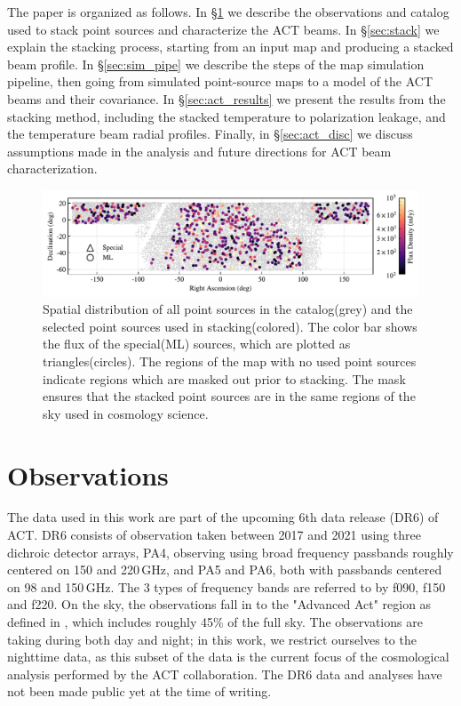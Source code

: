 The paper is organized as follows. 
In \S\ref{sec:observations} we describe the observations and catalog used to stack point sources and characterize the ACT beams.  In \S\ref{sec:stack} we explain the stacking process, starting from an input map and producing a stacked beam profile.  In \S\ref{sec:sim_pipe} we describe the steps of the map simulation pipeline, then going from simulated point-source maps to a model of the ACT beams and their covariance.  In \S\ref{sec:act_results} we present the results from the stacking method, including the stacked temperature to polarization leakage, and the temperature beam radial profiles.  Finally, in \S\ref{sec:act_disc} we discuss assumptions made in the analysis and future directions for ACT beam characterization.

\begin{figure}[t]
    \centering
    \includegraphics[width = \textwidth]{Figures/flux_map.pdf}
    \caption{Spatial distribution of all point sources in the catalog(grey) and the selected point sources used in stacking(colored).  The color bar shows the flux of the special(ML) sources, which are plotted as triangles(circles).  The regions of the map with no used point sources indicate regions which are masked out prior to stacking.  The mask ensures that the stacked point sources are in the same regions of the sky used in cosmology science.}
    \label{fig:ptsrc_map}
\end{figure}

\section{Observations}
\label{sec:observations}

The  data used in this work are part of the upcoming 6th data release (DR6) of ACT. DR6 consists of observation taken between 2017 and 2021 using three dichroic detector arrays, PA4, observing using broad frequency passbands roughly centered on  150 and 220\,GHz, and PA5 and PA6, both with passbands centered on 98 and 150\,GHz. The 3 types of frequency bands are referred to by f090, f150 and f220. On the sky, the observations fall in to the "Advanced Act" region as defined in \cite{aiola_2020}, which includes roughly 45\% of the full sky. The observations are taking during both day and night; in this work, we restrict ourselves to the nighttime data, as this subset of the data is the current focus of the cosmological analysis performed by the ACT collaboration. The DR6 data and analyses have not been made public yet at the time of writing.

